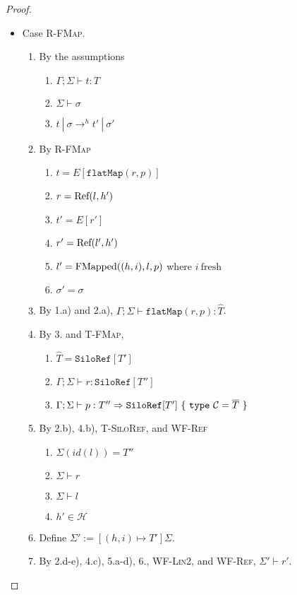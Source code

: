 \begin{proof}
\begin{itemize}
\item Case \textsc{R-FMap}.
\begin{enumerate}
\item By the assumptions
  \begin{enumerate}[label=(\alph*)]
  \item $\Gamma ; \Sigma \vdash t : T$
  \item $\Sigma \vdash \sigma$
  \item $t~|~\sigma \rightarrow^h t'~|~\sigma'$
  \end{enumerate}
\item By \textsc{R-FMap}
  \begin{enumerate}[label=(\alph*)]
  \item $t  = E[\texttt{flatMap}(r, p)]$
  \item $r  = {\textrm{Ref}(l, h')}$
  \item $t' = E[r']$
  \item $r' = {\textrm{Ref}(l', h')}$
  \item $l' = {\textrm{FMapped}((h, i), l, p)}$ where $i~\text{fresh}$
  \item $\sigma' = \sigma$
  \end{enumerate}
\item By 1.a) and 2.a), $\Gamma ; \Sigma \vdash \texttt{flatMap}(r, p) : \hat{T}$.
\item By 3. and \textsc{T-FMap},
  \begin{enumerate}[label=(\alph*)]
  \item $\hat{T} = \texttt{SiloRef}[T']$
  \item $\Gamma ; \Sigma \vdash r : \texttt{SiloRef}[T'']$
  \item $\Gamma ; \Sigma \vdash p : T'' \Rightarrow \texttt{SiloRef}[T']~\{~\texttt{type}~\mathcal{C} = \overline{T}~\}$
  \end{enumerate}
\item By 2.b), 4.b), \textsc{T-SiloRef}, and \textsc{WF-Ref}
  \begin{enumerate}[label=(\alph*)]
  \item $\Sigma(id(l)) = T''$
  \item $\Sigma \vdash r$
  \item $\Sigma \vdash l$
  \item $h' \in \mathcal{H}$
  \end{enumerate}
\item Define $\Sigma' := [(h, i) \mapsto T']\Sigma$.
\item By 2.d-e), 4.c), 5.a-d), 6., \textsc{WF-Lin2}, and \textsc{WF-Ref}, $\Sigma' \vdash r'$.

\end{enumerate}
\end{itemize}
\end{proof}
